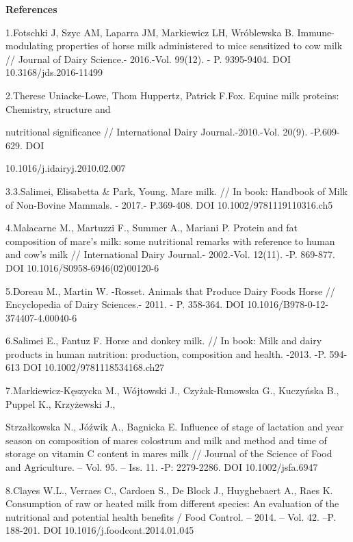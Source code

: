 \begin{center}
{\bfseries References}
\end{center}

\begin{noparindent}
1.Fotschki J, Szyc AM, Laparra JM, Markiewicz LH, Wróblewska B.
  Immune-modulating properties of horse milk administered to mice
  sensitized to cow milk // Journal of Dairy Science.- 2016.-Vol.
  99(12). - P. 9395-9404. DOI 10.3168/jds.2016-11499

2.Therese Uniacke-Lowe, Thom Huppertz, Patrick F.Fox. Equine milk
proteins: Chemistry, structure and

nutritional significance //
  International Dairy Journal.-2010.-Vol. 20(9). -P.609-629. DOI
  
  10.1016/j.idairyj.2010.02.007

3.3.Salimei, Elisabetta \& Park, Young. Mare milk. // In book: Handbook
  of Milk of Non-Bovine Mammals. - 2017.- P.369-408. DOI
  10.1002/9781119110316.ch5

4.Malacarne M., Martuzzi F., Summer A., Mariani P. Protein and fat
  composition of mare's milk: some nutritional remarks with reference to
  human and cow's milk // International Dairy Journal.- 2002.-Vol.
  12(11). -P. 869-877. DOI 10.1016/S0958-6946(02)00120-6

5.Doreau M., Martin W. -Rosset. Animals that Produce Dairy Foods
  \textbar{} Horse // Encyclopedia of Dairy Sciences.- 2011. - P.
  358-364. DOI 10.1016/B978-0-12-374407-4.00040-6

6.Salimei E., Fantuz F. Horse and donkey milk. // In book: Milk and
  dairy products in human nutrition: production, composition and health.
  -2013. -P. 594-613 DOI 10.1002/9781118534168.ch27

7.Markiewicz-Kęszycka M., Wójtowski J., Czyżak-Runowska G., Kuczyńska
B., Puppel K., Krzyżewski J.,

Strzałkowska N., Jóźwik A., Bagnicka E.
  Influence of stage of lactation and year season on composition of
  mares\textquotesingle{} colostrum and milk and method and time of
  storage on vitamin C content in mares\textquotesingle{} milk //
  Journal of the Science of Food and Agriculture. -- Vol. 95. -- Iss.
  11. -P: 2279-2286. DOI 10.1002/jsfa.6947

8.Clayes W.L., Verraes C., Cardoen S., De Block J., Huyghebaert A., Raes
  K. Consumption of raw or heated milk from different species: An
  evaluation of the nutritional and potential health benefits / Food
  Control. -- 2014. -- Vol. 42. --P. 188-201. DOI
  10.1016/j.foodcont.2014.01.045


\end{noparindent}
